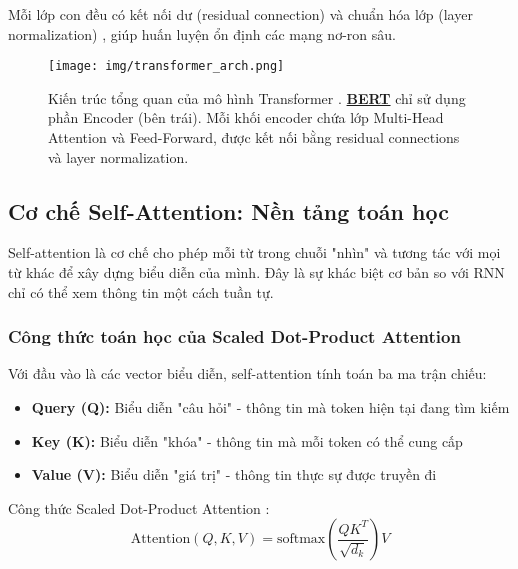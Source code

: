     Mỗi lớp con đều có kết nối dư (residual connection) và chuẩn hóa lớp (layer normalization) \cite{ba2016layer}, giúp huấn luyện ổn định các mạng nơ-ron sâu.
    
    \begin{figure}[H]
        \centering
        \texttt{[image: img/transformer\_arch.png]}
        \caption{Kiến trúc tổng quan của mô hình Transformer \cite{vaswani2017attention}. \hyperref[acro:bert]{\textbf{BERT}} chỉ sử dụng phần Encoder (bên trái). Mỗi khối encoder chứa lớp Multi-Head Attention và Feed-Forward, được kết nối bằng residual connections và layer normalization.}
        \label{fig:transformer_architecture}
    \end{figure}
    
    \subsection{Cơ chế Self-Attention: Nền tảng toán học}
    \label{ssec:self_attention}
    
    Self-attention là cơ chế cho phép mỗi từ trong chuỗi "nhìn" và tương tác với mọi từ khác để xây dựng biểu diễn của mình. Đây là sự khác biệt cơ bản so với RNN chỉ có thể xem thông tin một cách tuần tự.
    
    \subsubsection{Công thức toán học của Scaled Dot-Product Attention}
    Với đầu vào là các vector biểu diễn, self-attention tính toán ba ma trận chiếu:
    \begin{itemize}
        \item \textbf{Query (Q):} Biểu diễn "câu hỏi" - thông tin mà token hiện tại đang tìm kiếm
        \item \textbf{Key (K):} Biểu diễn "khóa" - thông tin mà mỗi token có thể cung cấp
        \item \textbf{Value (V):} Biểu diễn "giá trị" - thông tin thực sự được truyền đi
    \end{itemize}
    
    Công thức Scaled Dot-Product Attention \cite{vaswani2017attention}:
    \begin{equation}
    \text{Attention}(Q, K, V) = \text{softmax}\left(\frac{QK^T}{\sqrt{d_k}}\right)V
    \label{eq:scaled_attention}
    \end{equation}
    
